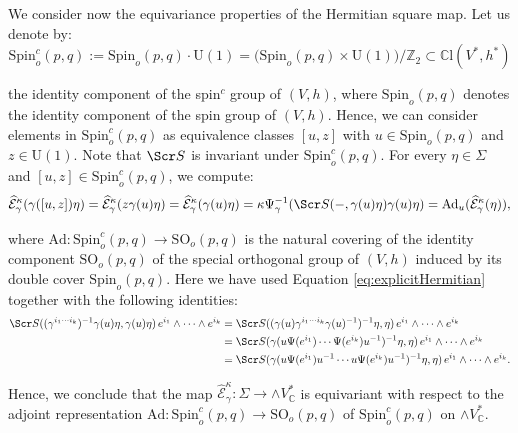 \documentclass[10pt,a4paper,twoside,reqno]{amsart}
\theoremstyle{plain}
\theoremstyle{definition}
\theoremstyle{remark}
\def\Z{\mathbb{Z}}
\def\C{\mathbb{C}}
\def\Ad{\mathrm{Ad}}
\def\scS{\Scr S}
\def\Spin{\mathrm{Spin}}
\def\Spin{\mathrm{Spin}}
\def\SO{\mathrm{SO}}
\def\U{\mathrm{U}}
\def\hcE{\widehat{\mathcal{E}}}
\begin{document}

We consider now the equivariance properties of the Hermitian square map. Let us denote by:
\begin{equation*}
\Spin_o^c (p,q) := \Spin_o(p,q)\cdot \U(1) = \big(\Spin_o(p,q)\times \U(1)\big)/\Z_2 \subset \mathbb{C}\mathrm{l}(V^*,h^*)    
\end{equation*}

\noindent
the identity component of the spin$^c$ group of $(V,h)$, where $\Spin_o(p,q)$ denotes the identity component of the spin group of $(V,h)$. Hence, we can consider elements in $\Spin_o^c(p,q)$ as equivalence classes $[u,z]$ with $u\in\Spin_o(p,q)$ and $z\in\U(1)$. Note that $\scS$ is invariant under $\Spin_o^c(p,q)$. For every $\eta\in \Sigma$ and $[u,z] \in \Spin_o^c(p,q)$, we compute:
\begin{eqnarray*}
\hcE_\gamma^\kappa(\gamma([u,z])\eta) = \hcE_\gamma^\kappa(z\gamma(u)\eta) =\hcE_\gamma^\kappa( \gamma(u)\eta) = \kappa \Psi_{\gamma}^{-1}(\scS( - , \gamma(u)\eta) \gamma(u)\eta) = \Ad_u(\hcE_\gamma^\kappa(\eta)),
\end{eqnarray*}

\noindent
where $\Ad\colon \Spin_o^c(p,q) \to \SO_o(p,q)$ is the natural covering of the identity component $\SO_o(p,q)$ of the special orthogonal group of $(V,h)$ induced by its double cover $\Spin_o(p,q)$. Here we have used Equation \eqref{eq:explicitHermitian} together with the following identities:
\begin{align*}
\scS((\gamma^{i_1 \cdots i_k})^{-1}\gamma(u)\eta , \gamma(u)\eta)\, e^{i_1}\wedge  \cdots \wedge e^{i_k} &= \scS((\gamma(u) \gamma^{i_1 \cdots i_k} \gamma(u)^{-1})^{-1}\eta , \eta)\, e^{i_1}\wedge  \cdots \wedge e^{i_k}\\
&= \scS(\gamma(u \Psi(e^{i_1}) \cdots \Psi(e^{i_k}) u^{-1})^{-1}\eta , \eta)\, e^{i_1}\wedge  \cdots \wedge e^{i_k}\\
&= \scS(\gamma(u \Psi(e^{i_1}) u^{-1} \cdots u \Psi(e^{i_k}) u^{-1})^{-1}\eta , \eta)\, e^{i_1}\wedge  \cdots \wedge e^{i_k}.
\end{align*}

\noindent
Hence, we conclude that the map $\hcE_\gamma^\kappa \colon \Sigma \to \wedge V^*_\C$ is equivariant with respect to the adjoint representation $\Ad\colon \Spin_o^c(p,q) \to \SO_o(p,q)$ of $\Spin_o^c(p,q)$ on $\wedge V^{\ast}_\C$.

\end{document}
